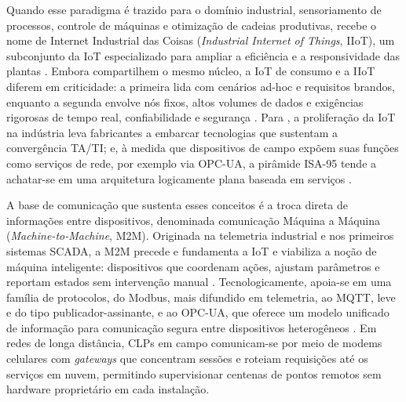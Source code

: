 \par Quando esse paradigma é trazido para o domínio industrial, sensoriamento de processos, controle de máquinas e otimização de cadeias produtivas, recebe o nome de Internet Industrial das Coisas (\emph{Industrial Internet of Things}, IIoT), um subconjunto da IoT especializado para ampliar a eficiência e a responsividade das plantas \cite{BIGHETI2020}. Embora compartilhem o mesmo núcleo, a IoT de consumo e a IIoT diferem em criticidade: a primeira lida com cenários ad-hoc e requisitos brandos, enquanto a segunda envolve nós fixos, altos volumes de dados e exigências rigorosas de tempo real, confiabilidade e segurança \cite{BIGHETI2020}. Para \textcite{PISCHING2017}, a proliferação da IoT na indústria leva fabricantes a embarcar tecnologias que sustentam a convergência TA/TI; e, à medida que dispositivos de campo expõem suas funções como serviços de rede, por exemplo via OPC-UA, a pirâmide ISA-95 \cite{ISA95_2000_ENTERPRISE_CONTROL} tende a achatar-se em uma arquitetura logicamente plana baseada em serviços \cite{COLOMBO2014_STATE_ART_AUTOMATION}.

\par A base de comunicação que sustenta esses conceitos é a troca direta de informações entre dispositivos, denominada comunicação Máquina a Máquina (\emph{Machine-to-Machine}, M2M). Originada na telemetria industrial e nos primeiros sistemas SCADA, a M2M precede e fundamenta a IoT e viabiliza a noção de máquina inteligente: dispositivos que coordenam ações, ajustam parâmetros e reportam estados sem intervenção manual \cite{BIGHETI2020,PISCHING2017}. Tecnologicamente, apoia-se em uma família de protocolos, do Modbus, mais difundido em telemetria, ao MQTT, leve e do tipo publicador-assinante, e ao OPC-UA, que oferece um modelo unificado de informação para comunicação segura entre dispositivos heterogêneos \cite{COLOMBO2014_STATE_ART_AUTOMATION}. Em redes de longa distância, CLPs em campo comunicam-se por meio de modems celulares com \emph{gateways} que concentram sessões e roteiam requisições até os serviços em nuvem, permitindo supervisionar centenas de pontos remotos sem hardware proprietário em cada instalação.

